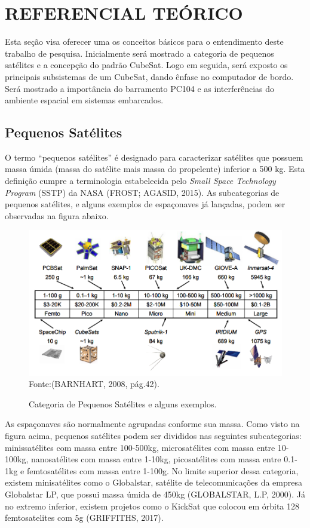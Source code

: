\chapter[REFERENCIAL TEÓRICO]{REFERENCIAL TEÓRICO}

Esta seção visa oferecer uma os conceitos básicos para o entendimento deste trabalho de pesquisa. Inicialmente será mostrado a categoria de pequenos satélites e a concepção do padrão CubeSat. Logo em seguida, será exposto os principais subsistemas de um CubeSat, dando ênfase no computador de bordo. Será mostrado a importância do barramento PC104 e as interferências do ambiente espacial em sistemas embarcados.


\section{Pequenos Satélites}

O termo “pequenos satélites” é designado para caracterizar satélites que possuem massa úmida (massa do satélite mais massa do propelente) inferior a 500 kg. Esta definição cumpre a terminologia estabelecida pelo \textit{Small Space Technology Program} (SSTP) da NASA (FROST; AGASID, 2015). As subcategorias de pequenos satélites, e alguns exemplos de espaçonaves já lançadas, podem ser observadas na figura abaixo.


\begin{figure}[h]
	\centering
    {\small\caption{Categoria de Pequenos Satélites e alguns exemplos.}}
	\includegraphics[keepaspectratio=true,scale=0.55]{figuras/categoria_satellite.PNG}
	Fonte:(BARNHART, 2008, pág.42).
	\label{fig02}
\end{figure}


As espaçonaves são normalmente agrupadas conforme sua massa. Como visto na figura acima, pequenos satélites podem ser divididos nas seguintes subcategorias: minissatélites com massa entre 100-500kg, microsatélites com massa entre 10-100kg, nanosatélites com massa entre 1-10kg, picosatélites com massa entre 0.1-1kg e femtosatélites com massa entre 1-100g. No limite superior dessa categoria, existem minisatélites como o Globalstar, satélite de telecomunicações da empresa Globalstar LP, que possui massa úmida de 450kg (GLOBALSTAR, L.P, 2000). Já no extremo inferior, existem projetos como o KickSat que colocou em órbita 128 femtosatelites  com 5g (GRIFFITHS, 2017).

